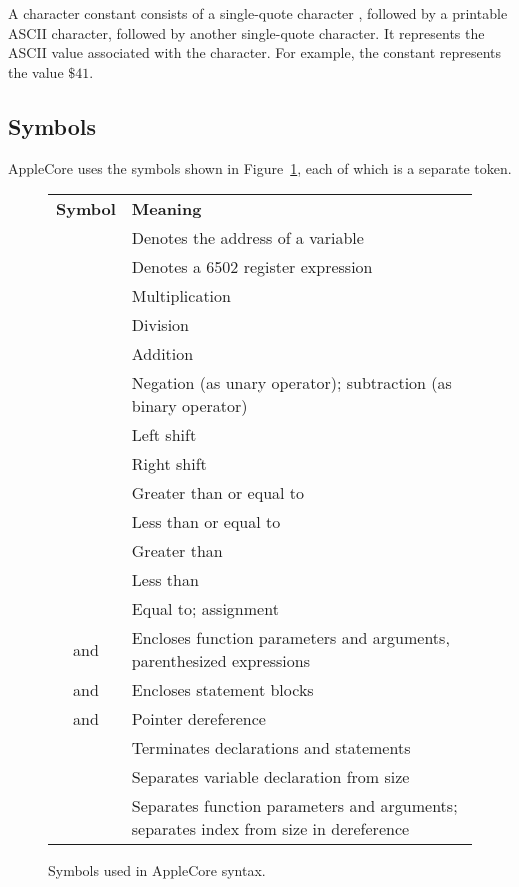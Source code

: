 \documentclass[10pt]{article}
\begin{document}
 A character constant consists of a
single-quote character , followed by a printable ASCII
character, followed by another single-quote character.  It represents
the ASCII value associated with the character.  For example, the
constant  represents the value $\$41$.

\subsection{Symbols}

AppleCore uses the symbols shown in Figure~\ref{fig:symbols}, each of
which is a separate token.

\begin{figure}[th]
\begin{center}
\begin{tabular}{c l}
\textbf{Symbol} & \textbf{Meaning} \\
%
\kwd{@} & Denotes the address of a variable \\
%
\kwd{\^} & Denotes a 6502 register expression \\
\kwd{*}  & Multiplication \\
\kwd{/}  & Division \\
\kwd{+}  & Addition \\
\kwd{-}  & Negation (as unary operator); subtraction (as binary
operator) \\
\kwd{<<} & Left shift \\
\kwd{>>} & Right shift \\
\kwd{>=} & Greater than or equal to \\
\kwd{<=} & Less than or equal to \\
\kwd{>}  & Greater than \\
\kwd{<}  & Less than \\
\kwd{=}  & Equal to; assignment \\
\kwd{(} and \kwd{)} & Encloses function parameters and arguments, parenthesized expressions
\\
\kwd{\{} and \kwd{\}} & Encloses statement blocks \\
\kwd{[} and \kwd{]} & Pointer dereference \\
\kwd{;} & Terminates declarations and statements \\
\kwd{:} & Separates variable declaration from size \\
\kwd{,} & Separates function parameters and arguments; separates index from size in dereference \\
\end{tabular}
\end{center}
\caption{Symbols used in AppleCore syntax.}
\label{fig:symbols}
\end{figure}
\end{document}
